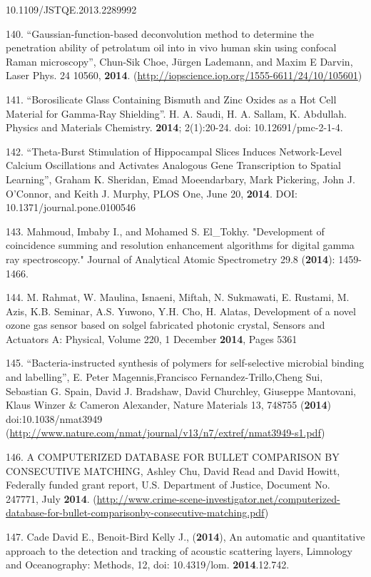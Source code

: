 10.1109/JSTQE.2013.2289992

140. ``Gaussian-function-based deconvolution method to determine the penetration ability of petrolatum oil into in vivo human skin using confocal Raman microscopy'', Chun-Sik Choe, J\"{u}rgen Lademann, and Maxim E Darvin, Laser Phys. 24 10560, \textbf{2014}. (\url{http://iopscience.iop.org/1555-6611/24/10/105601})

141. ``Borosilicate Glass Containing Bismuth and Zinc Oxides as a Hot Cell Material for Gamma-Ray Shielding''. H. A. Saudi, H. A. Sallam, K. Abdullah. Physics and Materials Chemistry. \textbf{2014}; 2(1):20-24. doi: 10.12691/pmc-2-1-4.

142. ``Theta-Burst Stimulation of Hippocampal Slices Induces Network-Level Calcium Oscillations and Activates Analogous Gene Transcription to Spatial Learning'', Graham K. Sheridan, Emad Moeendarbary, Mark Pickering, John J. O'Connor, and Keith J. Murphy, PLOS One, June 20, \textbf{2014}. DOI: 10.1371/journal.pone.0100546

143. Mahmoud, Imbaby I., and Mohamed S. El\_Tokhy. "Development of coincidence summing and resolution enhancement algorithms for digital gamma ray spectroscopy." Journal of Analytical Atomic Spectrometry 29.8 (\textbf{2014}): 1459-1466.

144. M. Rahmat, W. Maulina, Isnaeni, Miftah, N. Sukmawati, E. Rustami, M. Azis, K.B. Seminar, A.S. Yuwono, Y.H. Cho, H. Alatas, Development of a novel ozone gas sensor based on sol\textendash{}gel fabricated photonic crystal, Sensors and Actuators A: Physical, Volume 220, 1 December \textbf{2014}, Pages 53\textendash{}61

145. ``Bacteria-instructed synthesis of polymers for self-selective microbial binding and labelling'', E. Peter Magennis,Francisco Fernandez-Trillo,Cheng Sui, Sebastian G. Spain, David J. Bradshaw, David Churchley, Giuseppe Mantovani, Klaus Winzer \& Cameron Alexander, Nature Materials 13, 748\textendash{}755 (\textbf{2014}) doi:10.1038/nmat3949 (\url{http://www.nature.com/nmat/journal/v13/n7/extref/nmat3949-s1.pdf})

146. A COMPUTERIZED DATABASE FOR BULLET COMPARISON BY CONSECUTIVE MATCHING, Ashley Chu, David Read and David Howitt, Federally funded grant report, U.S. Department of Justice, Document No. 247771, July \textbf{2014}. (\url{http://www.crime-scene-investigator.net/computerized-database-for-bullet-comparisonby-consecutive-matching.pdf})

147. Cade David E., Benoit-Bird Kelly J., (\textbf{2014}), An automatic and quantitative approach to the detection and tracking of acoustic scattering layers, Limnology and Oceanography: Methods, 12, doi: 10.4319/lom. \textbf{2014}.12.742.

